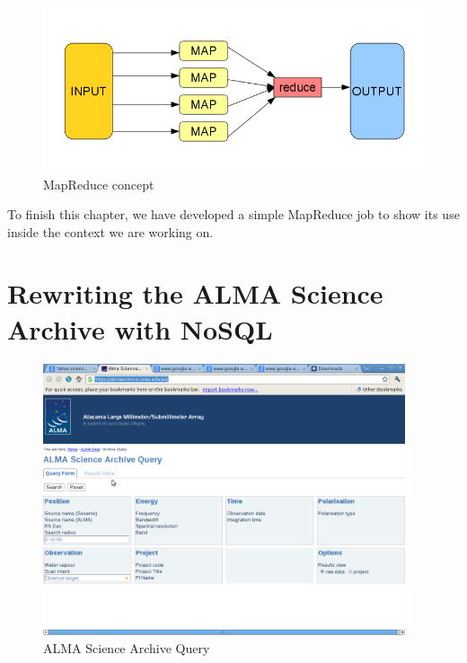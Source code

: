 \begin{figure}[tb]
\centering
\includegraphics[width=\textwidth]{images/map_reduce_chart.png}
\caption{MapReduce concept}
\end{figure}

To finish this chapter, we have developed a simple MapReduce job to show its use inside the context we are working on.




\section{Rewriting the ALMA Science Archive with NoSQL} %
\label{sec:rewriting_the_alma_science_archive_with_nosql}

\begin{figure}
\centering
\includegraphics[height=8cm]{images/aq.png}
\caption{ALMA Science Archive Query}
\end{figure}


